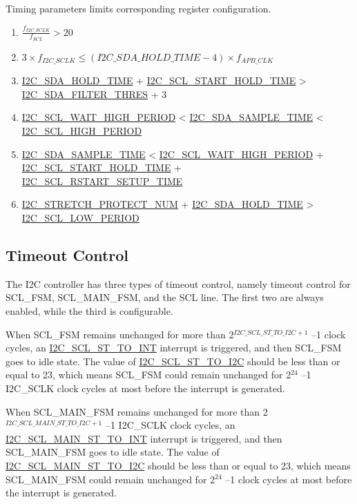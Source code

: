 \documentclass[main\_\_EN.tex]{subfiles}
\begin{document}
Timing parameters limits corresponding register configuration.
\begin{enumerate}
\item $\frac{f_{I2C\_SCLK}}{f_{SCL}}  > 20$
\item $3 \times f_{I2C\_SCLK} \leq (\hyperref[fielddesc:I2CSDAHOLDTIME]{I2C\_SDA\_HOLD\_TIME}-4) \times f_{APB\_CLK}$
\item \hyperref[fielddesc:I2CSDAHOLDTIME]{I2C\_SDA\_HOLD\_TIME} + \hyperref[fielddesc:I2CSCLSTARTHOLDTIME]{I2C\_SCL\_START\_HOLD\_TIME} > \hyperref[fielddesc:I2CSDAFILTERTHRES]{I2C\_SDA\_FILTER\_THRES} + 3
\item \hyperref[fielddesc:I2CSCLWAITHIGHPERIOD]{I2C\_SCL\_WAIT\_HIGH\_PERIOD} < \hyperref[fielddesc:I2CSDASAMPLETIME]{I2C\_SDA\_SAMPLE\_TIME} < \hyperref[fielddesc:I2CSCLHIGHPERIOD]{I2C\_SCL\_HIGH\_PERIOD}
\item \hyperref[fielddesc:I2CSDASAMPLETIME]{I2C\_SDA\_SAMPLE\_TIME} < \hyperref[fielddesc:I2CSCLWAITHIGHPERIOD]{I2C\_SCL\_WAIT\_HIGH\_PERIOD} + \hyperref[fielddesc:I2CSCLSTARTHOLDTIME]{I2C\_SCL\_START\_HOLD\_TIME} + \\\hyperref[fielddesc:I2CSCLRSTARTSETUPTIME]{I2C\_SCL\_RSTART\_SETUP\_TIME}
\item \hyperref[fielddesc:I2CSTRETCHPROTECTNUM]{I2C\_STRETCH\_PROTECT\_NUM} + \hyperref[fielddesc:I2CSDAHOLDTIME]{I2C\_SDA\_HOLD\_TIME} > \hyperref[fielddesc:I2CSCLLOWPERIOD]{I2C\_SCL\_LOW\_PERIOD}
\end{enumerate}



\subsection{Timeout Control}
The I2C controller has three types of timeout control, namely timeout control for SCL\_FSM, SCL\_MAIN\_FSM, and the SCL line. The first two are always enabled, while the third is configurable.

When SCL\_FSM remains unchanged for more than 2$^{\hyperref[fielddesc:I2CSCLSTTOI2C]{I2C\_SCL\_ST\_TO\_I2C}+1}$ –1 clock cycles, an \hyperref[int:i2c-scl-fsm]{I2C\_SCL\_ST\_TO\_INT} interrupt is triggered, and then SCL\_FSM goes to idle state. The value of \hyperref[fielddesc:I2CSCLSTTOI2C]{I2C\_SCL\_ST\_TO\_I2C} should be less than or equal to 23, which means SCL\_FSM could remain unchanged for 2$^{24}$ –1 I2C\_SCLK clock cycles at most before the interrupt is generated.

When SCL\_MAIN\_FSM remains unchanged for more than 2$^{ \hyperref[fielddesc:I2CSCLMAINSTTOI2C]{I2C\_SCL\_MAIN\_ST\_TO\_I2C} +1}$ –1 I2C\_SCLK clock cycles, an \hyperref[int:i2c-scl-main-fsm]{I2C\_SCL\_MAIN\_ST\_TO\_INT} interrupt is triggered, and then SCL\_MAIN\_FSM goes to idle state. The value of \hyperref[fielddesc:I2CSCLMAINSTTOI2C]{I2C\_SCL\_MAIN\_ST\_TO\_I2C} should be less than or equal to 23, which means SCL\_MAIN\_FSM could remain unchanged for 2$^{24}$ –1 clock cycles at most before the interrupt is generated.
\end{document}

